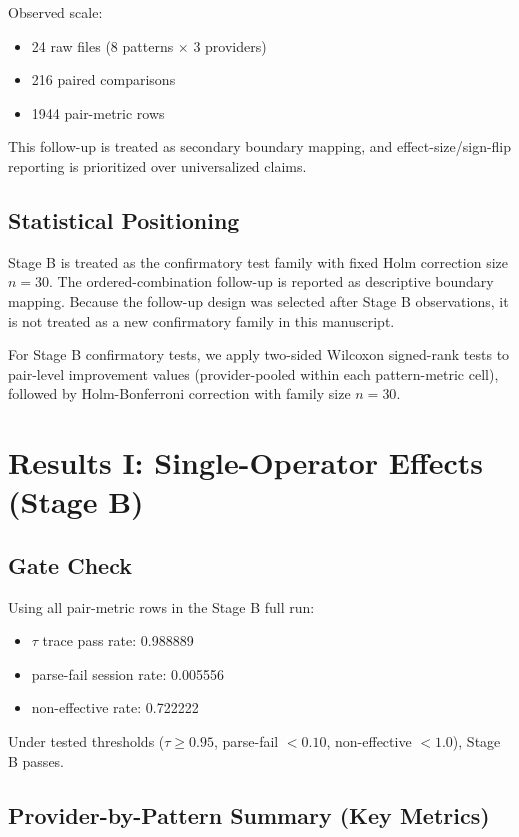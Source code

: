 \documentclass[11pt,a4paper]{article}
\begin{document}
Observed scale:
\begin{itemize}
  \item 24 raw files (8 patterns $\times$ 3 providers)
  \item 216 paired comparisons
  \item 1944 pair-metric rows
\end{itemize}

This follow-up is treated as secondary boundary mapping, and effect-size/sign-flip reporting is prioritized over universalized claims.

\subsection{Statistical Positioning}

Stage B is treated as the confirmatory test family with fixed Holm correction size $n=30$. The ordered-combination follow-up is reported as descriptive boundary mapping. Because the follow-up design was selected after Stage B observations, it is not treated as a new confirmatory family in this manuscript.

For Stage B confirmatory tests, we apply two-sided Wilcoxon signed-rank tests to pair-level improvement values (provider-pooled within each pattern-metric cell), followed by Holm-Bonferroni correction with family size $n=30$.

\section{Results I: Single-Operator Effects (Stage B)}
\label{sec:results_stageb}

\subsection{Gate Check}

Using all pair-metric rows in the Stage B full run:
\begin{itemize}
  \item $\tau$ trace pass rate: 0.988889
  \item parse-fail session rate: 0.005556
  \item non-effective rate: 0.722222
\end{itemize}

Under tested thresholds ($\tau\geq0.95$, parse-fail $<0.10$, non-effective $<1.0$), Stage B passes.

\subsection{Provider-by-Pattern Summary (Key Metrics)}
\end{document}
